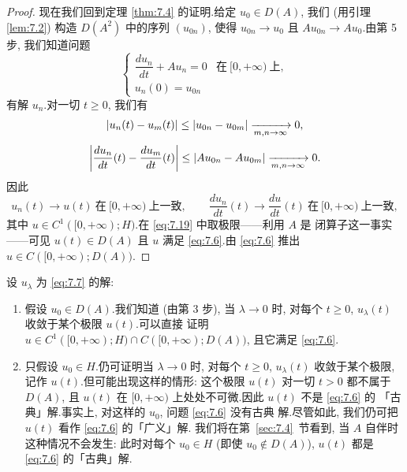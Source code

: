 \begin{proof}
现在我们回到定理  \ref{thm:7.4} 的证明.给定 $u_0\in D(A)$, 我们 (用引理
 \ref{lem:7.2}) 构造 $D(A^2)$ 中的序列 $(u_{0n})$, 使得 $u_{0n}\to u_0$ 且
$Au_{0n}\to Au_0$.由第 5 步, 我们知道问题
\begin{equation}
\begin{cases}
\dfrac{du_n}{dt}+Au_n=0 & \text{在}\ [0,+\infty)\ \text{上},\\
u_n(0)=u_{0n}
\end{cases}
\label{eq:7.19}
\end{equation}
有解 $u_n$.对一切 $t\ge0$, 我们有
\begin{equation*}
\left|u_n(t)-u_m(t)\right|\le\left|u_{0n}-u_{0m}\right|
\xrightarrow[m,n\to\infty]{}0,
\end{equation*}
\begin{equation*}
\left|\frac{du_n}{dt}(t)-\frac{du_m}{dt}(t)\right|
\le\left|Au_{0n}-Au_{0m}\right|
\xrightarrow[m,n\to\infty]{}0.
\end{equation*}
因此
\begin{equation*}
u_n(t)\to u(t)\ \text{在}\ [0,+\infty)\ \text{上一致},
\qquad
\frac{du_n}{dt}(t)\to\frac{du}{dt}(t)
\ \text{在}\ [0,+\infty)\ \text{上一致},
\end{equation*}
其中 $u\in C^1([0,+\infty);H)$.在 \eqref{eq:7.19} 中取极限——利用 $A$ 是
闭算子这一事实——可见 $u(t)\in D(A)$ 且 $u$ 满足 \eqref{eq:7.6}.由
\eqref{eq:7.6} 推出 $u\in C([0,+\infty);D(A))$.
\end{proof}

\begin{remark}
\label{rem:7.4}
设 $u_\lambda$ 为 \eqref{eq:7.7} 的解:
\begin{enumerate}[label=(\alph*), leftmargin=2.2em, itemsep=0.2em]
	\item 假设 $u_0\in D(A)$.我们知道 (由第 3 步), 当 $\lambda\to0$ 时,
	      对每个 $t\ge0$, $u_\lambda(t)$ 收敛于某个极限 $u(t)$.可以直接
	      证明 $u\in C^1([0,+\infty);H)\cap C([0,+\infty);D(A))$, 且它满足
	      \eqref{eq:7.6}.
	\item 只假设 $u_0\in H$.仍可证明当 $\lambda\to0$ 时, 对每个 $t\ge0$,
	      $u_\lambda(t)$ 收敛于某个极限, 记作 $u(t)$.但可能出现这样的情形:
	      这个极限 $u(t)$ 对一切 $t>0$ 都不属于 $D(A)$, 且 $u(t)$ 在
	      $[0,+\infty)$ 上处处不可微.因此 $u(t)$ 不是 \eqref{eq:7.6} 的
	      「古典」解.事实上, 对这样的 $u_0$, 问题 \eqref{eq:7.6} 没有古典
	      解.尽管如此, 我们仍可把 $u(t)$ 看作 \eqref{eq:7.6} 的「广义」解.
	      我们将在第~\ref{sec:7.4}~节看到, 当 $A$ 自伴时这种情况不会发生: 此时对每个
	      $u_0\in H$ (即使 $u_0\notin D(A)$), $u(t)$ 都是 \eqref{eq:7.6}
	      的「古典」解.
\end{enumerate}
\end{remark}

